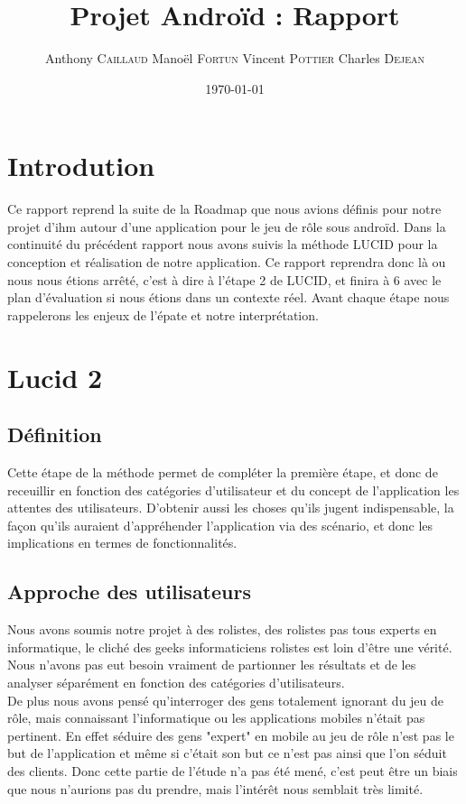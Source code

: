 \documentclass[11pt,a4paper]{article}
\title{Projet Androïd : Rapport}
\author{Anthony \textsc{Caillaud} Manoël \textsc{Fortun} Vincent
\textsc{Pottier} Charles \textsc{Dejean}}
\date{\today}
\begin{document}
\maketitle

\clearpage
\tableofcontents
\clearpage
\section{Introdution}

Ce rapport reprend la suite de la Roadmap que nous avions définis pour notre
projet d'ihm autour d'une application pour le jeu de rôle sous androïd.
Dans la continuité du précédent rapport nous avons suivis la méthode LUCID pour
la conception et réalisation de notre application. Ce rapport reprendra donc là
ou nous nous étions arrêté, c'est à dire à l'étape 2 de LUCID, et finira à 6
avec le plan d'évaluation si nous étions dans un contexte réel.
Avant chaque étape nous rappelerons les enjeux de l'épate et notre
interprétation.

\clearpage

\section{Lucid 2}

\subsection{Définition}

Cette étape de la méthode permet de compléter la première étape, et donc de
receuillir en fonction des catégories d'utilisateur et du concept de
l'application les attentes des utilisateurs. D'obtenir aussi les choses qu'ils
jugent indispensable, la façon qu'ils auraient d'appréhender l'application via
des scénario, et donc les implications en termes de fonctionnalités.

\subsection{Approche des utilisateurs}

Nous avons soumis notre projet à des rolistes, des rolistes pas tous experts en informatique, 
le cliché des geeks informaticiens rolistes est loin d'être une vérité. Nous n'avons pas eut besoin 
vraiment de partionner les résultats et de les analyser séparément en fonction des catégories d'utilisateurs.\\

De plus nous avons pensé qu'interroger des gens totalement ignorant du jeu de rôle, mais connaissant
l'informatique ou les applications mobiles n'était pas pertinent. En effet séduire des gens "expert" en mobile
au jeu de rôle n'est pas le but de l'application et même si c'était son but ce n'est pas ainsi que l'on séduit des clients.
Donc cette partie de l'étude n'a pas été mené, c'est peut être un biais que nous n'aurions pas du prendre, mais 
l'intérêt nous semblait très limité.\\
\end{document}
